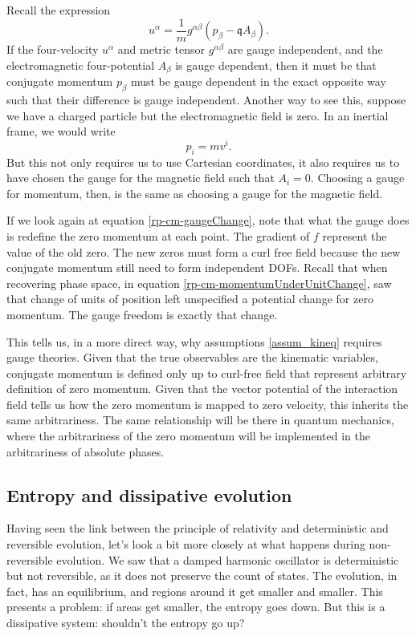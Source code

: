 Recall the expression
\begin{equation}
	u^{\alpha} = \frac{1}{m} g^{\alpha\beta}(p_{\beta} - \mathfrak{q} A_{\beta}).
\end{equation}
If the four-velocity $u^{\alpha}$ and metric tensor $g^{\alpha\beta}$ are gauge independent, and the electromagnetic four-potential $A_\beta$ is gauge dependent, then it must be that conjugate momentum $p_\beta$ must be gauge dependent in the exact opposite way such that their difference is gauge independent. Another way to see this, suppose we have a charged particle but the electromagnetic field is zero. In an inertial frame, we would write
\begin{equation}
	p_i = m v^i.
\end{equation}
But this not only requires us to use Cartesian coordinates, it also requires us to have chosen the gauge for the magnetic field such that $A_i = 0$. Choosing a gauge for momentum, then, is the same as choosing a gauge for the magnetic field.

If we look again at equation \ref{rp-cm-gaugeChange}, note that what the gauge does is redefine the zero momentum at each point. The gradient of $f$ represent the value of the old zero. The new zeros must form a curl free field because the new conjugate momentum still need to form independent DOFs. Recall that when recovering phase space, in equation \ref{rp-cm-momentumUnderUnitChange}, saw that change of units of position left unspecified a potential change for zero momentum. The gauge freedom is exactly that change.

This tells us, in a more direct way, why assumptions \ref{assum_kineq} requires gauge theories. Given that the true observables are the kinematic variables, conjugate momentum is defined only up to curl-free field that represent arbitrary definition of zero momentum. Given that the vector potential of the interaction field tells us how the zero momentum is mapped to zero velocity, this inherits the same arbitrariness. The same relationship will be there in quantum mechanics, where the arbitrariness of the zero momentum will be implemented in the arbitrariness of absolute phases.

\subsection{Entropy and dissipative evolution}

Having seen the link between the principle of relativity and deterministic and reversible evolution, let's look a bit more closely at what happens during non-reversible evolution. We saw that a damped harmonic oscillator is deterministic but not reversible, as it does not preserve the count of states. The evolution, in fact, has an equilibrium, and regions around it get smaller and smaller. This presents a problem: if areas get smaller, the entropy goes down. But this is a dissipative system: shouldn't the entropy go up?

